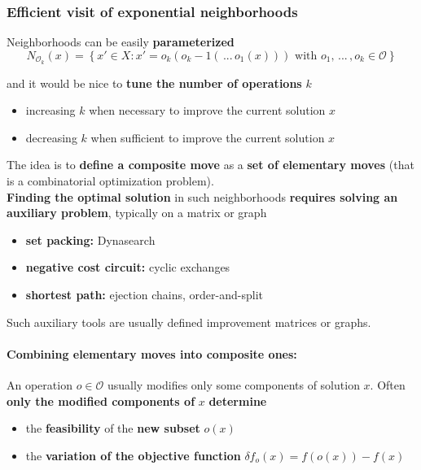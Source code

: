 \documentclass[11pt]{article}
\begin{document}
	\newpage
	
	\subsubsection{Efficient visit of exponential neighborhoods}
	
	Neighborhoods can be easily \textbf{parameterized}
	$$ N_{\mathcal{O}_k} (x) = \left\{ x' \in X : x' = o_k (o_k−1 (\, ... \, o_1 (x))) \text{ with } o_1, \, ... \, , o_k \in \mathcal{O} \right\} $$
	
	and it would be nice to \textbf{tune the number of operations} $k$
	\begin{itemize}
		\item increasing $k$ when necessary to improve the current solution $x$
		
		\item decreasing $k$ when sufficient to improve the current solution $x$
	\end{itemize}
	
	The idea is to \textbf{define a composite move} as a \textbf{set of elementary moves} (that is a combinatorial optimization problem).\\
	
	\textbf{Finding the optimal solution} in such neighborhoods \textbf{requires solving an auxiliary problem}, typically on a matrix or graph
	\begin{itemize}
		\item \textbf{set packing:} Dynasearch
		
		\item \textbf{negative cost circuit:} cyclic exchanges
		
		\item \textbf{shortest path:} ejection chains, order-and-split
	\end{itemize}
	
	Such auxiliary tools are usually defined improvement matrices or graphs.\\
	
	\paragraph{Combining elementary moves into composite ones:} An operation $o \in \mathcal{O}$ usually modifies only some components of solution $x$. Often \textbf{only the modified components of} $x$ \textbf{determine}
	\begin{itemize}
		\item the \textbf{feasibility} of the \textbf{new subset} $o (x)$
		
		\item the \textbf{variation of the objective function} $\delta f_o (x) = f (o (x)) - f (x)$
	\end{itemize}
	
\end{document}
